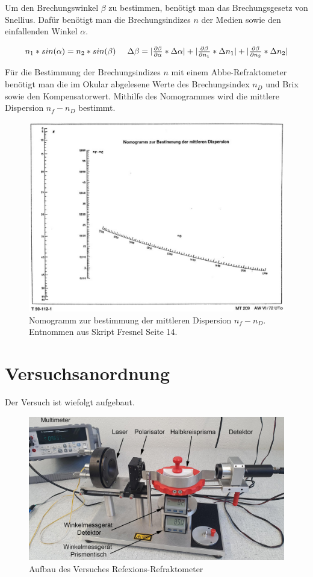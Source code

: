 \documentclass[12pt,a4paper,twoside]{article}
\begin{document}
\noindent
Um den Brechungswinkel $\beta$ zu bestimmen, benötigt man das Brechungsgesetz von Snellius. Dafür benötigt man die Brechungsindizes $n$ der Medien sowie den einfallenden Winkel $\alpha$. 

\begin{equation}
    \label{eq:Snellius}
    \centerline{$n_1 * sin(\alpha) = n_2 * sin(\beta)$ \\ $\Delta \beta = \vert \frac{\partial \beta}{\partial \alpha} * \Delta \alpha \vert + \vert \frac{\partial \beta}{\partial n_1} * \Delta n_1 \vert + \vert \frac{\partial \beta}{\partial n_2} * \Delta n_2 \vert$}
\end{equation}

\noindent
Für die Bestimmung der Brechungsindizes $n$ mit einem Abbe-Refraktometer benötigt man die im Okular abgelesene Werte des Brechungsindex $n_D$ und Brix sowie den Kompensatorwert. 
Mithilfe des Nomogrammes wird die mittlere Dispersion $n_f-n_D$ bestimmt. 

\begin{figure}[H]
    \centering
    \includegraphics[width=0.6\linewidth]{nudes/nomogramm.jpg}
    \caption{Nomogramm zur bestimmung der mittleren Dispersion $n_f-n_D$. Entnommen aus Skript Fresnel Seite 14. \cite{teachcenter2}}
    \label{fig:nomogramm}
\end{figure}

\section{Versuchsanordnung} %
Der Versuch ist wiefolgt aufgebaut. 

\begin{figure}[H]
    \centering
    \includegraphics[width=0.7\linewidth]{nudes/Aufbau.jpg}
    \caption{Aufbau des Versuches Refexions-Refraktometer}
    \label{fig:aufbau}
\end{figure}
\end{document}
